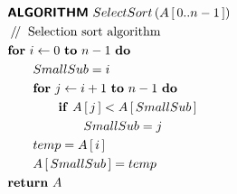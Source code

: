 \begin{fleqn}
	\begin{align*}
		& \text{\textbf{\textsf{ALGORITHM}}} \ SelectSort\left( A\left[ \,0..n-1\, \right] \right) \\
		& \mathbin{/\mkern-3mu/} \text{ Selection sort algorithm } \\
		& \text{\textbf{for}} \ i \leftarrow 0 \ \text{\textbf{to}} \ n - 1 \ \text{\textbf{do}} \ \\
		& \qquad SmallSub = i \\
		& \qquad \text{\textbf{for}} \ j \leftarrow i + 1 \ \text{\textbf{to}} \ n - 1 \ \text{\textbf{do}} \ \\
		& \qquad \qquad \text{\textbf{if}} \ A\left[ \,j\, \right] < A\left[ \,SmallSub\, \right] \\
		& \qquad \qquad \qquad SmallSub = j \\
		& \qquad temp = A\left[ \,i\, \right] \\
		& \qquad A\left[ \,SmallSub\, \right] = temp \\
		& \text{\textbf{return}} \ A
	\end{align*}
\end{fleqn}